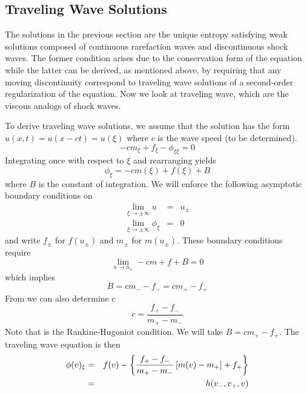 \documentclass[10pt,dvips,twoside,reqno]{amsart}
\begin{document}
\subsection{Traveling Wave Solutions}

The solutions in the previous section are the unique entropy
satisfying weak solutions composed of continuous rarefaction waves and
discontinuous shock waves. The former condition arises due to the
conservation form of the equation while the latter can be derived, as
mentioned above, by requiring that any moving discontinuity correspond
to traveling wave solutions of a second-order regularization of the
equation. Now we look at traveling wave, which are the viscous analogs
of shock waves.

To derive traveling wave solutions, we assume that the solution has
the form $u(x,t) = u(x - ct) = u(\xi)$ where $c$ is the wave speed (to
be determined).
\begin{equation}
  \label{eq:travOdePrim1}
  -c m_\xi + f_\xi - \phi_{\xi \xi} = 0
\end{equation}
Integrating once with respect to $\xi$ and rearranging yields
\begin{equation}
  \label{eq:travOdePrim2}
  \phi_\xi  = -c m(\xi) + f(\xi) + B
\end{equation}
where $B$ is the constant of integration. We will enforce the
following asymptotic boundary conditions on 
\begin{eqnarray}
  \lim_{\xi \rightarrow \pm \infty} u &=& u_{\pm} \label{eq:travOdeData1}\\
  \lim_{\xi \rightarrow \pm \infty} \phi_\xi &=& 0  \label{eq:travOdeData2}
\end{eqnarray}
and write $f_{\pm}$ for $f(u_{\pm})$ and $m_{\pm}$ for $m(u_{\pm})$.
These boundary conditions require
\begin{equation}
  \label{eq:travLim}
  \lim_{u \rightarrow u_{\pm}} -c m + f + B = 0
\end{equation}
which implies
\begin{equation}
  \label{eq:travConst}
  B = c m_- - f_- = c m_+ - f_+
\end{equation}
From  we can also determine $c$
\begin{equation}
  \label{eq:travSpeed}
  c = \frac{f_+ - f_-}{m_+ - m_-}
\end{equation}
Note that  is the Rankine-Hugoniot condition.  We will
take $B=c m_+ - f_+$. The traveling wave equation is then
\begin{eqnarray}
\label{eq:travOde}
\phi(v)_\xi  &=& f(v) - \left\{ \frac{f_+ - f_-}{m_+ - m_-} \left[ m(v) - m_+ \right] + f_+\right\} \\
&=& h(v_-,v_+,v)
\end{eqnarray}
\end{document}
